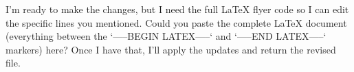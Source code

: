 I’m ready to make the changes, but I need the full LaTeX flyer code so I can edit the specific lines you mentioned. Could you paste the complete LaTeX document (everything between the `-----BEGIN LATEX-----` and `-----END LATEX-----` markers) here? Once I have that, I’ll apply the updates and return the revised file.